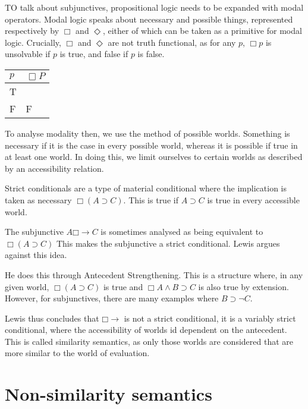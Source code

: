 \documentclass[12pt]{report}
\newcommand{\would}{\mathbin{\Box}{\rightarrow}}
\begin{document}
TO talk about subjunctives, propositional logic needs to be expanded with modal
operators. Modal logic speaks about necessary and possible things, represented
respectively by $\Box$ and $\Diamond$, either of which can be taken as a
primitive for modal logic. Crucially, $\Box$ and $\Diamond$ are not truth
functional, as for any $p$, $\Box p$ is unsolvable if $p$ is true, and false if
$p$ is false.

\begin{tabular}{l|l}
$p$ & $\Box P$ \\
\hline
T & \\
F & F\\
\end{tabular}

To analyse modality then, we use the method of possible worlds. Something is
necessary if it is the case in every possible world, whereas it is possible if
true in at least one world. In doing this, we limit ourselves to certain worlds
as described by an accessibility relation. 

Strict conditionals are a type of material conditional where the implication is
taken as necessary $\Box(A \supset C)$. This is true if $A \supset C$ is true in
every accessible world.

The subjunctive $A \would C$ is sometimes analysed as being equivalent to $\Box
(A \supset C)$ This makes the subjunctive a strict conditional. Lewis argues
against this idea. 

He does this through Antecedent Strengthening. This is a structure where, in any
given world, $\Box(A \supset C)$ is true and $\Box A \land B \supset C$ is also
true by extension. However, for subjunctives, there are many examples where $B
\supset \lnot C$.

Lewis thus concludes that $\would$ is not a strict conditional, it is a variably
strict conditional, where the accessibility of worlds id dependent on the
antecedent. This is called similarity semantics, as only those worlds are
considered that are more similar to the world of evaluation.

\chapter{Non-similarity semantics}
\end{document}
